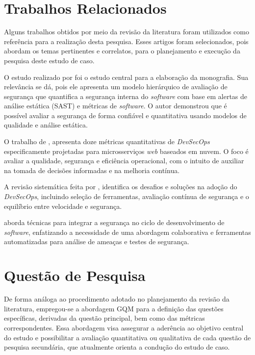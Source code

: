 \section{Trabalhos Relacionados}

Alguns trabalhos obtidos por meio da revisão da literatura foram utilizados como referência para a realização desta pesquisa. Esses artigos foram selecionados, pois abordam os temas pertinentes e correlatos, para o planejamento e execução da pesquisa deste estudo de caso. 

O estudo realizado por  foi o estudo central para a elaboração da monografia. Sua relevância se dá, pois ele apresenta um modelo hierárquico de avaliação de segurança que quantifica a segurança interna do \textit{software} com base em alertas de análise estática (SAST) e métricas de \textit{software}.
O autor demonstrou que é possível avaliar a segurança de forma confiável e quantitativa usando modelos de qualidade e análise estática.

O trabalho de \cite{Zhang2024160317}, apresenta doze métricas quantitativas de \textit{DevSecOps} especificamente projetadas para microsserviços \textit{web} baseados em nuvem. O foco é avaliar a qualidade, segurança e eficiência operacional, com o intuito de auxiliar na tomada de decisões informadas e na melhoria contínua.

A revisão sistemática feita por , identifica os desafios e soluções na adoção do \textit{DevSecOps}, incluindo seleção de ferramentas, avaliação contínua de segurança e o equilíbrio entre velocidade e segurança.

 aborda técnicas para integrar a segurança no ciclo de desenvolvimento de \textit{software}, enfatizando a necessidade de uma abordagem colaborativa e ferramentas automatizadas para análise de ameaças e testes de segurança.

\section{Questão de Pesquisa}
\label{sec:questoes-caso}

De forma análoga ao procedimento adotado no planejamento da revisão da literatura, empregou-se a abordagem GQM  para a definição das questões específicas, derivadas da questão principal, bem como das métricas correspondentes. Essa abordagem visa assegurar a aderência ao objetivo central do estudo e possibilitar a avaliação quantitativa ou qualitativa de cada questão de pesquisa secundária, que atualmente orienta a condução do estudo de caso.

